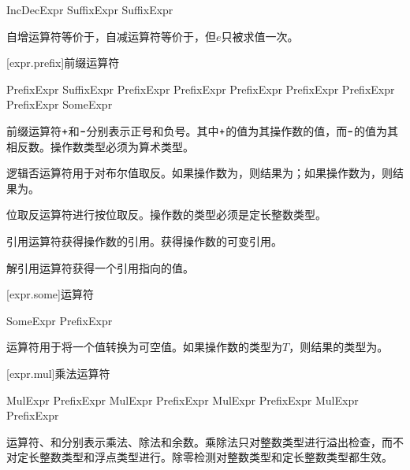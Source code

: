 \begin{bnf}{IncDecExpr}
    SuffixExpr \terminal{++} \br
    SuffixExpr \terminal{--}
\end{bnf}

\pnum
自增运算符等价于，自减运算符等价于，但$e$只被求值一次。

[expr.prefix]{前缀运算符}

\begin{bnf}{PrefixExpr}
    SuffixExpr \br
    \terminal{+} PrefixExpr \br
    \terminal{-} PrefixExpr \br
    \terminal{!} PrefixExpr \br
     PrefixExpr \br
    \terminal{\&} \bnfq PrefixExpr \br
    \terminal{*} PrefixExpr \br
    SomeExpr
\end{bnf}

\pnum
前缀运算符$\mathbin{\texttt{+}}$和$\mathbin{\texttt{-}}$分别表示正号和负号。其中$\mathbin{\texttt{+}}$的值为其操作数的值，而$\mathbin{\texttt{-}}$的值为其相反数。操作数类型必须为算术类型。

\pnum
逻辑否运算符\tcode{!}用于对布尔值取反。如果操作数为，则结果为；如果操作数为，则结果为。

\pnum
位取反运算符进行按位取反。操作数的类型必须是定长整数类型。

\pnum
引用运算符\tcode{\&}获得操作数的引用。获得操作数的可变引用。

\pnum
解引用运算符\tcode{*}获得一个引用指向的值。

[expr.some]{运算符}

\begin{bnf}{SomeExpr}
     PrefixExpr
\end{bnf}

\pnum
{}运算符用于将一个值转换为可空值。如果操作数的类型为$T$，则结果的类型为。

[expr.mul]{乘法运算符}

\begin{bnf}{MulExpr}
    PrefixExpr \br
    MulExpr \terminal{*} PrefixExpr \br
    MulExpr \terminal{/} PrefixExpr \br
    MulExpr \terminal{\%} PrefixExpr
\end{bnf}

\pnum
运算符\tcode{*}、\tcode{/}和\tcode{\%}分别表示乘法、除法和余数。乘除法只对整数类型进行溢出检查，而不对定长整数类型和浮点类型进行。除零检测对整数类型和定长整数类型都生效。

